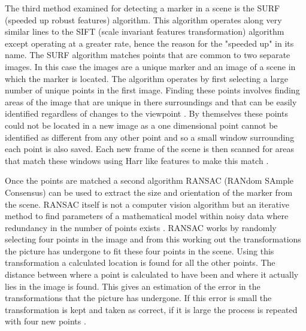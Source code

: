 The third method examined for detecting a marker in a scene is the SURF (speeded up robust features) algorithm. This algorithm operates along very similar lines to the SIFT (scale invariant features transformation) algorithm except operating at a greater rate, hence the reason for the "speeded up" in its name. The SURF algorithm matches points that are common to two separate images. In this case the images are a unique marker and an image of a scene in which the marker is located. The algorithm operates by first selecting a large number of unique points in the first image. Finding these points involves finding areas of the image that are unique in there surroundings and that can be easily identified regardless of changes to the viewpoint \cite{surf}. By themselves these points could not be located in a new image as a one dimensional point cannot be identified as different from any other point and so a small window surrounding each point is also saved. Each new frame of the scene is then scanned for areas that match these windows using Harr like features to make this match \cite{haar_like}.

Once the points are matched a second algorithm RANSAC (RANdom SAmple Consensus) can be used to extract the size and orientation of the marker from the scene. RANSAC itself is not a computer vision algorithm but an iterative method to find parameters of a mathematical model within noisy data where redundancy in the number of points exists \cite{cosc428}. RANSAC works by randomly selecting four points in the image and from this working out the transformations the picture has undergone to fit these four points in the scene. Using this transformation a calculated location is found for all the other points. The distance between where a point is calculated to have been and where it actually lies in the image is found. This gives an estimation of the error in the transformations that the picture has undergone. If this error is small the transformation is kept and taken as correct, if it is large the process is repeated with four new points \cite{ransac}.